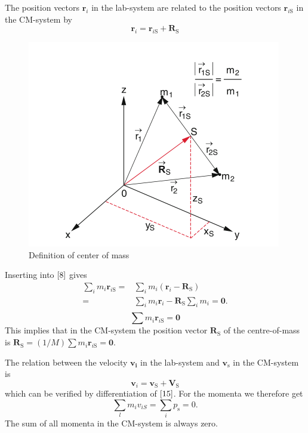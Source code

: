 \documentclass[12pt]{book}
\theoremstyle{definition}\newtheorem{dfn}{Définition}[chapter]
\theoremstyle{plain}\newtheorem{thm}{Théorème}[chapter]
\theoremstyle{plain}\newtheorem{prp}{Proposition}[chapter]
\theoremstyle{plain}\newtheorem{lem}{\bf Lemme}[chapter]
\theoremstyle{plain}\newtheorem{axm}{\bf Axiome}[chapter]
\theoremstyle{plain}\newtheorem{lmm}{\bf Lemme}[chapter]
\theoremstyle{plain}\newtheorem{cor}{\bf Corollaire}[chapter]
\theoremstyle{remark}\newtheorem{rem}{Remarque}[chapter]
\begin{document}
The position vectors $\boldsymbol{r}_{i}$ in the lab-system are related to the position vectors $\boldsymbol{r}_{i\mathrm{S}}$ in the CM-system by
\begin{equation}
\boldsymbol{r}_{i}=\boldsymbol{r}_{i\mathrm{S}}+\boldsymbol{R}_{\mathrm{S}}\label{15}
\end{equation}
\begin{figure}[H]
	\centering
	\includegraphics[scale=0.7]{image//Systems of Point Masses//1}
	\caption{Definition of center of mass}
\end{figure}
Inserting into $\ref{8}$ gives
$$\begin{aligned}
	\sum_{i} m_{i} \boldsymbol{r}_{i\mathrm{S}}=& \sum_{i} m_{i}\left(\boldsymbol{r}_{i}-\boldsymbol{R}_{\mathrm{S}}\right) \\
	=& \sum_{i} m_{i} \boldsymbol{r}_{i}-\boldsymbol{R}_{\mathrm{S}} \sum_{i} m_{i}=\mathbf{0}. \\
\end{aligned}$$
\begin{equation}
\sum m_{i} \boldsymbol{r}_{i\mathrm{S}}=\mathbf{0}
\end{equation}
 This implies that in the CM-system the position vector $\boldsymbol{R}_{\mathrm{S}}$ of the centre-of-mass is $\boldsymbol{R}_{\mathrm{S}}=(1 / M) \sum m_{i} \boldsymbol{r}_{i\mathrm{S}}=\mathbf{0}.$

The relation between the velocity $\boldsymbol{v_{i}}$ in the lab-system and $\boldsymbol{v_{\mathrm{s}}}$ in the CM-system is
\begin{equation}
\boldsymbol{v}_{i}=\boldsymbol{v}_{\mathrm{S}}+\boldsymbol{V}_{\mathrm{S}}
\end{equation}
which can be verified by differentiation of $\ref{15}$. For the momenta we therefore get
\begin{equation}
\sum_{l} m_{i} v_{i S}=\sum_{i} p_{\mathrm{s}}=0.
\end{equation}
The sum of all momenta in the CM-system is always zero.
\end{document}

